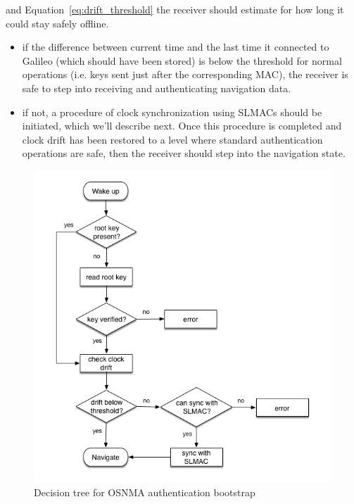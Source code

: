 \begin{itemize}
    and Equation~\ref{eq:drift_threshold} the receiver should estimate for how
    long it could stay safely offline. 
    \begin{itemize}
      \item if the difference between current time and the last time it
        connected to Galileo (which should have been stored) is below the
        threshold for normal operations (i.e. keys sent just after the
        corresponding MAC), the receiver is safe to step into receiving and
        authenticating navigation data.
      \item if not, a procedure of clock synchronization using SLMACs should be
        initiated, which we'll describe next. Once this procedure is completed
        and clock drift has been restored to a level where standard
        authentication operations are safe, then the receiver should step into
        the navigation state.
    \end{itemize}
\end{itemize}

\begin{figure}[h!]
  \includegraphics[width=\linewidth]{figures/flowchart_bootstrap.png}
  \caption{Decision tree for OSNMA authentication bootstrap}
  \label{fig:flowchart_boostrap}
\end{figure}

